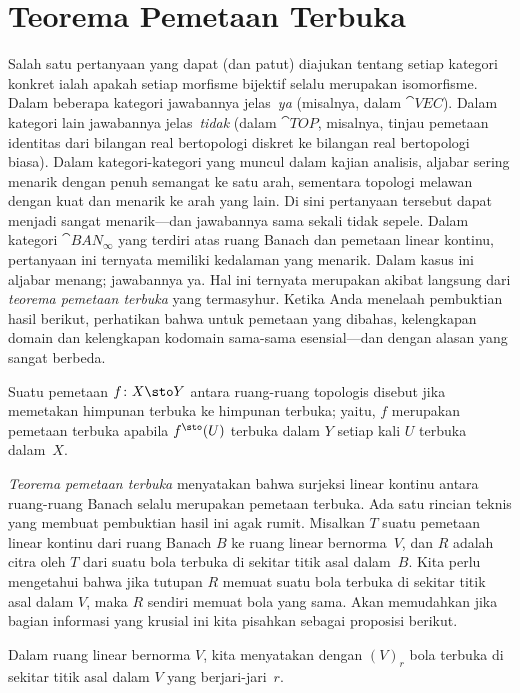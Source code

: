 \section{Teorema Pemetaan Terbuka}\label{C0694}
Salah satu pertanyaan yang dapat (dan patut) diajukan tentang setiap kategori konkret ialah apakah setiap morfisme bijektif selalu merupakan
isomorfisme.  Dalam beberapa kategori jawabannya jelas \,\emph{ya} (misalnya, dalam $\cat{VEC}$).  Dalam kategori lain
jawabannya jelas \,\emph{tidak} (dalam $\cat{TOP}$, misalnya, tinjau pemetaan identitas dari bilangan
real bertopologi diskret ke bilangan real bertopologi biasa).  Dalam kategori-kategori yang muncul dalam
kajian analisis, aljabar sering menarik dengan penuh semangat ke satu arah, sementara topologi melawan dengan kuat dan menarik
ke arah yang lain.  Di sini pertanyaan tersebut dapat menjadi sangat menarik---dan jawabannya sama sekali tidak sepele.  Dalam kategori
$\cat{BAN_\infty}$ yang terdiri atas ruang Banach dan pemetaan linear kontinu, pertanyaan ini ternyata memiliki kedalaman yang menarik.  Dalam
kasus ini aljabar menang; jawabannya ya.  Hal ini ternyata merupakan akibat langsung dari \emph{teorema
pemetaan terbuka} yang termasyhur.  Ketika Anda menelaah pembuktian hasil berikut, perhatikan bahwa untuk pemetaan yang dibahas,
kelengkapan domain dan kelengkapan kodomain sama-sama esensial---dan dengan alasan yang sangat berbeda.

\begin{defn} Suatu pemetaan $f \colon X \sto Y$ antara ruang-ruang topologis disebut
 jika memetakan himpunan terbuka ke himpunan terbuka; yaitu, $f$ merupakan pemetaan terbuka apabila $f^{\sto}(U)$ terbuka dalam $Y$
setiap kali $U$ terbuka dalam~$X$.
\end{defn}

\emph{Teorema pemetaan terbuka} menyatakan bahwa surjeksi linear kontinu antara ruang-ruang Banach selalu merupakan pemetaan terbuka.
Ada satu rincian teknis yang membuat pembuktian hasil ini agak rumit.  Misalkan $T$ suatu pemetaan linear kontinu
dari ruang Banach $B$ ke ruang linear bernorma~$V$, dan $R$ adalah citra oleh $T$ dari suatu bola terbuka di sekitar
titik asal dalam~$B$.  Kita perlu mengetahui bahwa jika tutupan $R$ memuat suatu bola terbuka di sekitar titik asal dalam $V$, maka
$R$ sendiri memuat bola yang sama. Akan memudahkan jika bagian informasi yang krusial ini kita pisahkan sebagai proposisi berikut.

\begin{notn} Dalam ruang linear bernorma $V$, kita menyatakan dengan
$(V)_r$ bola terbuka di sekitar titik asal dalam $V$ yang berjari-jari~$r$.
\end{notn}

